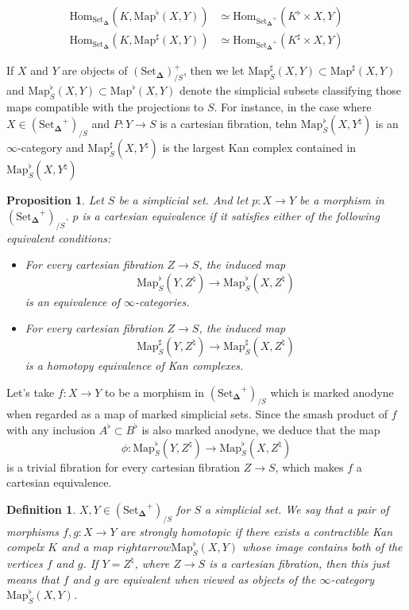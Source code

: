 \documentclass{amsart}
\newcommand{\8}{\ensuremath{\infty}}
\newcommand{\SSet}{\ensuremath{\text{Set}_{\boldsymbol{\Delta}}}}
\newcommand{\Map}{\ensuremath{\text{Map}}}
\newcommand{\Hom}{\ensuremath{\text{Hom}}}
\newtheorem{definition}{Definition}
\newtheorem{proposition}{Proposition}
\begin{document}
\begin{align*}
  \Hom_{\SSet}(K,\Map^\flat(X,Y))  & \simeq \Hom_{\SSet^+}(K^\flat\times X,Y)  \\
  \Hom_{\SSet}(K,\Map^\sharp(X,Y)) & \simeq \Hom_{\SSet^+}(K^\sharp\times X,Y)
\end{align*}

If $X$ and $Y$ are objects of $(\SSet)^+_{/S}$, then we let $\Map_S^\sharp(X,Y) \subset \Map^\sharp(X,Y)$ and $\Map_S^\flat(X,Y) \subset \Map^\flat(X,Y)$ denote the simplicial subsets classifying those maps compatible with the projections to $S$. For instance, in the case where $X\in(\SSet^+)_{/S}$ and $P:Y\rightarrow S$ is a cartesian fibration, tehn $\Map^\flat_S(X,Y^\natural)$ is an \8-category and $\Map^\sharp_S(X,Y^\natural)$ is the largest Kan complex contained in $\Map^\flat_S(X,Y^\natural)$

\begin{proposition}
  Let $S$ be a simplicial set. And let $p:X\rightarrow Y$ be a morphism in $(\SSet^+)_{/S}$. $p$ is a cartesian equivalence if it satisfies either of the following equivalent conditions:
  \begin{itemize}
    \item[(1)] For every cartesian fibration $Z\rightarrow S$, the induced map
          \[\Map^\flat_S(Y,Z^\natural)\rightarrow \Map_S^\flat(X,Z^\natural)\] is an equivalence of \8-categories.
    \item[(2)] For every cartesian fibration $Z\rightarrow S$, the induced map \[\Map^\sharp_S(Y,Z^\natural)\rightarrow \Map_S^\sharp(X,Z^\natural)\] is a homotopy equivalence of Kan complexes.
  \end{itemize}
\end{proposition}

Let's take $f:X\rightarrow Y$ to be a morphism in $(\SSet^+)_{/S}$ which is marked anodyne when regarded as a map of marked simplicial sets. Since the smash product of $f$ with any inclusion $A^\flat\subset B^\flat$ is also marked anodyne, we deduce that the map \[\phi:\Map_S^\flat(Y,Z^\natural)\rightarrow \Map_S^\flat(X,Z^\natural)\] is a trivial fibration for every cartesian fibration $Z\rightarrow S$, which makes $f$ a cartesian equivalence.

\begin{definition}
  $X,Y\in(\SSet^+)_{/S}$ for $S$ a simplicial set. We say that a pair of morphisms $f,g:X\rightarrow Y$ are strongly homotopic if there exists a contractible Kan compelx $K$ and a map $rightarrow \Map^\flat_S(X,Y)$ whose image contains both of the vertices $f$ and $g$. If $Y = Z^\natural$, where $Z\rightarrow S$ is a cartesian fibration, then this just means that $f$ and $g$ are equivalent when viewed as objects of the \8-category $\Map_S^\flat(X,Y)$.
\end{definition}
\end{document}

